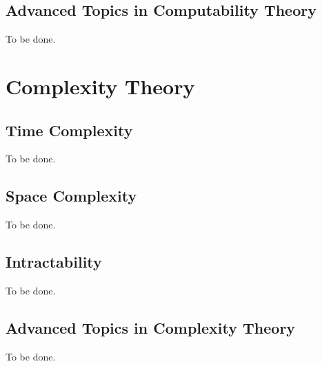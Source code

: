 \documentclass[12pt]{report}
\begin{document}


\chapter{Advanced Topics in Computability Theory}

To be done.

\part{Complexity Theory}

\chapter{Time Complexity}

To be done.

\chapter{Space Complexity}

To be done.

\chapter{Intractability}

To be done.

\chapter{Advanced Topics in Complexity Theory}

To be done.
\end{document}
